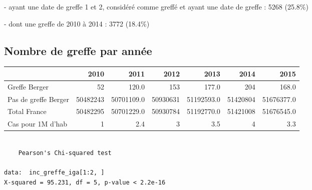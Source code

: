 \documentclass[11pt,a4paper]{article}\usepackage[]{graphicx}\usepackage[]{color}
\makeatletter
\newenvironment{kframe}{%
 \def\at@end@of@kframe{}%
 \ifinner\ifhmode%
  \def\at@end@of@kframe{\end{minipage}}%
  \begin{minipage}{\columnwidth}%
 \fi\fi%
 \def\FrameCommand##1{\hskip\@totalleftmargin \hskip-\fboxsep
 \colorbox{shadecolor}{##1}\hskip-\fboxsep
     \hskip-\linewidth \hskip-\@totalleftmargin \hskip\columnwidth}%
 \MakeFramed {\advance\hsize-\width
   \@totalleftmargin\z@ \linewidth\hsize
   \@setminipage}}%
 {\par\unskip\endMakeFramed%
 \at@end@of@kframe}
\newenvironment{knitrout}{}{} %
\makeatother
\begin{document}
- ayant une date de greffe 1 et 2, considéré comme greffé et ayant une date de greffe : 5268 (25.8\%)

\qquad - dont une greffe de 2010 à 2014 : 3772 (18.4\%)

  \subsection{Nombre de greffe par année}

\begin{table}[H]
\centering
\begin{tabular}{lrrrrrr}
  \hline
 & 2010 & 2011 & 2012 & 2013 & 2014 & 2015 \\ 
  \hline
Greffe Berger & 52 & 120.0 & 153 & 177.0 & 204 & 168.0 \\ 
  Pas de greffe Berger & 50482243 & 50701109.0 & 50930631 & 51192593.0 & 51420804 & 51676377.0 \\ 
  Total France & 50482295 & 50701229.0 & 50930784 & 51192770.0 & 51421008 & 51676545.0 \\ 
  Cas pour 1M d'hab &  1 & 2.4 &  3 & 3.5 &  4 & 3.3 \\ 
   \hline
\end{tabular}
\end{table}


\begin{knitrout}
\color{fgcolor}\begin{kframe}
\begin{verbatim}

	Pearson's Chi-squared test

data:  inc_greffe_iga[1:2, ]
X-squared = 95.231, df = 5, p-value < 2.2e-16
\end{verbatim}
\end{kframe}
\end{knitrout}
\end{document}

